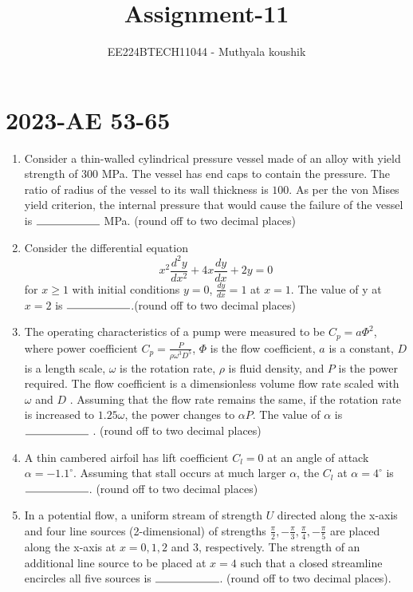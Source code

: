 \documentclass[journal,12pt,onecolumn]{IEEEtran}
\theoremstyle{remark}
\begin{document}

\vspace{3cm}

\title{Assignment-11}
\author{EE224BTECH11044 - Muthyala koushik
}
\maketitle
\bigskip

\renewcommand{\thefigure}{\theenumi}
\renewcommand{\thetable}{\theenumi}

\section{2023-AE 53-65}
\begin{enumerate}[start=53]
	\item Consider a thin-walled cylindrical pressure vessel made of an alloy with yield strength of $300$ MPa. The vessel has end caps to contain the pressure. The ratio of radius of the vessel to its wall thickness is $100$. As per the von Mises yield criterion, the internal pressure that would cause the failure of the vessel is $\rule{2cm}{0.4pt}$ MPa. (round off to two decimal places)

	\item Consider the differential equation
		$$x^2\frac{d^2y}{dx^2}+4x\frac{dy}{dx}+2y=0$$
		for $x\geq 1$ with initial conditions $y=0$, $\frac{dy}{dx}=1$ at $x=1$. The value of y at $x=2$ is $\rule{2cm}{0.4pt}$.(round off to two decimal places)

	\item The operating characteristics of a pump were measured to be $C_p=a{\Phi}^2$, where power coefficient $C_p=\frac{P}{\rho{\omega}^3D^5}$, $\Phi$ is the flow coefficient, $a$ is a constant, $D$ is a length scale, $\omega$ is the rotation rate, $\rho$ is fluid density, and $P$ is the power required. The flow coefficient is a dimensionless volume flow rate scaled with $\omega$ and $D$ . Assuming that the flow rate remains the same, if the rotation rate is increased to $1.25\omega$, the power changes to $\alpha P$. The value of $\alpha$ is $\rule{2cm}{0.4pt}$ . (round off to two decimal places)

	\item A thin cambered airfoil has lift coefficient $C_l=0$ at an angle of attack $\alpha=-1.1^\circ$. Assuming that stall occurs at much larger $\alpha$, the $C_l$ at $\alpha=4^\circ$ is $\rule{2cm}{0.4pt}$. (round off to two decimal places)

	\item In a potential flow, a uniform stream of strength $ U $ directed along the x-axis and four line sources (2-dimensional) of strengths $\frac{\pi}{2}, -\frac{\pi}{3}, \frac{\pi}{4}, -\frac{\pi}{5}$ are placed along the x-axis at $ x = 0, 1, 2 $ and $ 3 $, respectively. The strength of an additional line source to be placed at $ x = 4 $ such that a closed streamline encircles all five sources is $\rule{2cm}{0.4pt}$. (round off to two decimal places).


\end{enumerate}
\end{document}
